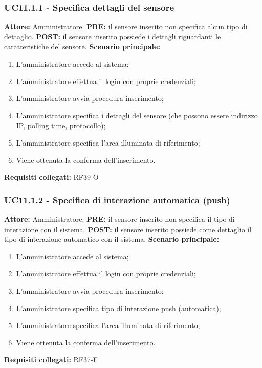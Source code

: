 \documentclass[a4paper, 12pt]{article}
\begin{document}
\subsubsection{UC11.1.1 - Specifica dettagli del sensore}
\textbf{Attore:} Amministratore.\newline
\textbf{PRE:} il sensore inserito non specifica alcun tipo di dettaglio.\newline
\textbf{POST:} il sensore inserito possiede i dettagli riguardanti le caratteristiche del sensore.\newline
\textbf{Scenario principale:}
\begin{enumerate}
    \item L'amministratore accede al sistema;
    \item L'amministratore effettua il login con proprie credenziali;
    \item L'amministratore avvia procedura inserimento;
    \item L'amministratore specifica i dettagli del sensore (che possono essere indirizzo IP, polling time, protocollo);
    \item L'amministratore specifica l'area illuminata di riferimento;
    \item Viene ottenuta la conferma dell'inserimento.
\end{enumerate}
\textbf{Requisiti collegati:} RF39-O\newline

\subsubsection{UC11.1.2 - Specifica di interazione automatica (push)}
\textbf{Attore:} Amministratore.\newline
\textbf{PRE:} il sensore inserito non specifica il tipo di interazione con il sistema.\newline
\textbf{POST:} il sensore inserito possiede come dettaglio il tipo di interazione automatico con il sistema.\newline
\textbf{Scenario principale:}
\begin{enumerate}
    \item L'amministratore accede al sistema;
    \item L'amministratore effettua il login con proprie credenziali;
    \item L'amministratore avvia procedura inserimento;
    \item L'amministratore specifica tipo di interazione push (automatica);
    \item L'amministratore specifica l'area illuminata di riferimento;
    \item Viene ottenuta la conferma dell'inserimento.
\end{enumerate}
\textbf{Requisiti collegati:} RF37-F\newline
\end{document}
